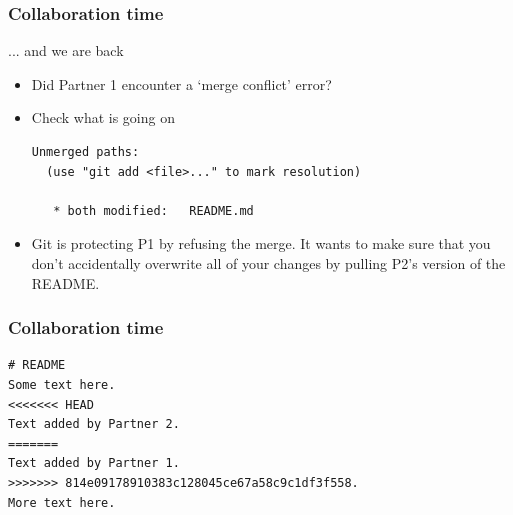 \documentclass[
  shownotes,
  xcolor={svgnames},
  hyperref={colorlinks,citecolor=DarkBlue,linkcolor=DarkRed,urlcolor=DarkBlue}
  ]{beamer}
\newenvironment{Shaded}{\begin{snugshade}}{\end{snugshade}}
\newcommand{\FunctionTok}[1]{\textcolor[rgb]{0.00,0.00,0.00}{#1}}
\newcommand{\NormalTok}[1]{#1}
\begin{document}
\begin{frame}[fragile]
\frametitle{Collaboration time}
... and we are back
\bigskip
\begin{itemize}
  \item Did Partner 1 encounter a `merge conflict' error? 
  \pause
  \item Check what is going on
  \begin{Shaded}
\end{Shaded}


\begin{verbatim}
Unmerged paths:
  (use "git add <file>..." to mark resolution)

   * both modified:   README.md 
\end{verbatim}

\bigskip
\item Git is protecting P1 by refusing the merge. It wants to make sure that you don't accidentally overwrite all of your changes by pulling P2's version of the README.



\end{itemize}
\end{frame}

\begin{frame}[fragile]
\frametitle{Collaboration time}


\begin{verbatim}
# README
Some text here.
<<<<<<< HEAD
Text added by Partner 2.
=======
Text added by Partner 1.
>>>>>>> 814e09178910383c128045ce67a58c9c1df3f558.
More text here.
\end{verbatim}

\end{frame}
\end{document}
